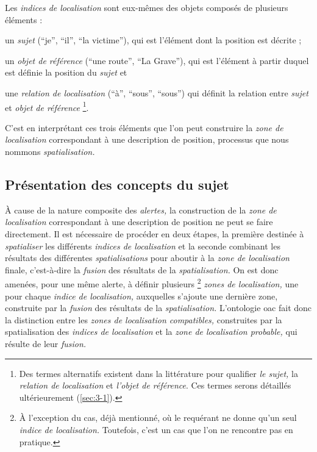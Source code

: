 Les \emph{indices de localisation} sont eux-mêmes des objets composés
de plusieurs éléments :
%
\begin{enumerate*}[label=(\alph*)]
\item un \emph{sujet} (\eg \enquote{je}, \enquote{il}, \enquote{la
    victime}), qui est l'élément dont la position est décrite ;
\item un \emph{objet de référence} (\eg \enquote{une route},
  \enquote{La Grave}), qui est l'élément à partir duquel est définie
  la position du \emph{sujet} et
\item une \emph{relation de localisation} (\eg \enquote{à},
  \enquote{sous}, \enquote{sous}) qui définit la relation entre
  \emph{sujet} et \emph{objet de référence} \footnote{Des termes
    alternatifs existent dans la littérature pour qualifier \emph{le
      sujet,} la \emph{relation de localisation} et \emph{l'objet de
      référence}. Ces termes serons détaillés ultérieurement
    (\ref{sec:3-1}).}.
\end{enumerate*}
%
C'est en interprétant ces trois éléments que l'on peut construire la
\emph{zone de localisation} correspondant à une description de
position, processus que nous nommons \emph{spatialisation.}

\subsection{Présentation des concepts du sujet}
\label{subsec:2-2}



À cause de la nature composite des \emph{alertes,} la construction de
la \emph{zone de localisation} correspondant à une description de
position ne peut se faire directement. Il est nécessaire de procéder
en deux étapes, la première destinée à \emph{spatialiser} les
différents \emph{indices de localisation} et la seconde combinant les
résultats des différentes \emph{spatialisations} pour aboutir à la
\emph{zone de localisation} finale, c'est-à-dire la \emph{fusion} des
résultats de la \emph{spatialisation.} On est donc amenées, pour une
même alerte, à définir plusieurs \footnote{À l'exception du cas, déjà
  mentionné, où le requérant ne donne qu'un seul \emph{indice de
    localisation.}  Toutefois, c'est un cas que l'on ne rencontre pas
  en pratique.}  \emph{zones de localisation,} une pour chaque
\emph{indice de localisation,} auxquelles s'ajoute une dernière zone,
construite par la \emph{fusion} des résultats de la
\emph{spatialisation.}  L'ontologie \ac{oac} \autocite{Viry2019} fait
donc la distinction entre les \emph{zones de localisation
  compatibles,} construites par la spatialisation des \emph{indices de
  localisation} et la \emph{zone de localisation probable,} qui
résulte de leur \emph{fusion.}

